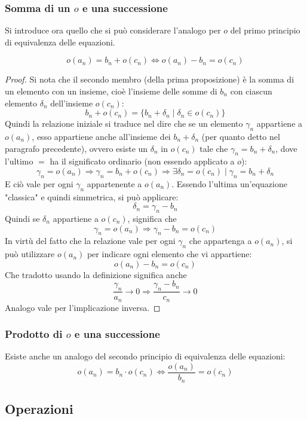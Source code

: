 \subsubsection{Somma di un $o$ e una successione}
Si introduce ora quello che si può considerare l'analogo per $o$ del primo principio di equivalenza delle equazioni.
\begin{teor}
	\[
		o(a_n)=b_n+o(c_n)\iff o(a_n)-b_n=o(c_n)
	\]
\end{teor}
\begin{proof}
	Si nota che il secondo membro (della prima proposizione) è la somma di un elemento con un insieme, cioè l'insieme delle somme di $b_n$ con ciascun elemento $\delta_n$ dell'insieme $o(c_n)$:
	\[
		b_n+o(c_n) = \{b_n+\delta_n\mid\delta_n\in o(c_n)\}
	\]
	Quindi la relazione iniziale si traduce nel dire che se un elemento $\gamma_n$ appartiene a $o(a_n)$, esso appartiene anche all'insieme dei $b_n+\delta_n$ (per quanto detto nel paragrafo precedente), ovvero esiste un $\delta_n$ in $o(c_n)$ tale che $\gamma_n=b_n+\delta_n$, dove l'ultimo $=$ ha il significato ordinario (non essendo applicato a $o$):
	\[
		\gamma_n=o(a_n)\Rightarrow\gamma_n=b_n+o(c_n)\Rightarrow\exists\delta_n=o(c_n)\mid\gamma_n=b_n+\delta_n
	\]
	E ciò vale per ogni $\gamma_n$ appartenente a $o(a_n)$. Essendo l'ultima un'equazione "classica" e quindi simmetrica, si può applicare:
	\[
		\delta_n=\gamma_n-b_n
	\]
	Quindi se $\delta_n$ appartiene a $o(c_n)$, significa che
	\[
		\gamma_n=o(a_n)\Rightarrow\gamma_n-b_n=o(c_n)
	\]
	In virtù del fatto che la relazione vale per ogni $\gamma_n$ che appartenga a $o(a_n)$, si può utilizzare $o(a_n)$ per indicare ogni elemento che vi appartiene:
	\[
		o(a_n)-b_n=o(c_n)
	\]
	Che tradotto usando la definizione significa anche
	\[
		\frac{\gamma_n}{a_n}\to0\Rightarrow\frac{\gamma_n-b_n}{c_n}\to0
	\]
	Analogo vale per l'implicazione inversa.
\end{proof}

\subsubsection{Prodotto di $o$ e una successione}
Esiste anche un analogo del secondo principio di equivalenza delle equazioni:
\[
	o(a_n)=b_n\cdot o(c_n)\iff\frac{o(a_n)}{b_n}=o(c_n)
\]


\subsection{Operazioni}

